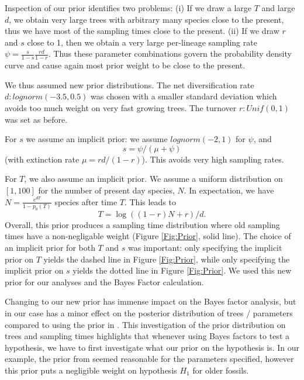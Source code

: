 \documentclass[11pt]{article}
\begin{document}
Inspection of our prior identifies two problems: (i) If we draw a large   $T$ and large $d$, we obtain very large trees with arbitrary many species close to the present, thus we have most of the sampling times close to the present. (ii) If we draw $r$ and $s$ close to 1, then we obtain a very large per-lineage  sampling rate $\psi=\frac{s}{1-s} \frac{rd}{1-r}$. Thus these parameter combinations govern the probability density curve and cause again most prior weight to be close to the present.

We thus assumed new prior distributions. The net diversification rate $d: lognorm(-3.5,0.5)$ was chosen with a  smaller standard deviation which avoids  too much weight on very fast growing trees. The turnover $r: Unif(0,1)$ was set as before. 

For $s$ we assume an implicit prior: we assume $lognorm(-2,1)$ for $\psi$, and $$s=\psi/(\mu+\psi)$$ (with extinction rate $\mu = r d /(1-r)$). This avoids very high sampling rates.

For $T$, we also assume an implicit prior. We assume a uniform distribution on $[1,100]$ for the number of present day species, $N$. In expectation, we have $N=  \frac{e^{d T}}{1-p_0(T)}$ species after time $T$. This leads to $$T=\log((1-r)N +r)/d.$$
Overall, this prior produces a sampling time distribution where old sampling times have a non-negligable weight (Figure \ref{Fig:Prior}, solid line). 
The choice of an implicit prior for both $T$ and $s$ was important: only specifying the implicit prior on $T$ yields the dashed line in Figure \ref{Fig:Prior}, while only specifying the implicit prior on $s$ yields the dotted line in Figure \ref{Fig:Prior}.
We used this new prior for our  analyses and the Bayes Factor calculation.

Changing to our new prior has immense impact on the Bayes factor analysis, but in our case has a minor effect on the posterior distribution of trees / parameters compared to using the prior in  \cite{gavryushkina2015bayesian}.
This investigation of the prior distribution on trees and sampling times highlights that whenever using Bayes factors to test a hypothesis, we have to first investigate what our prior on the hypothesis is. In our example, the  prior from \cite{gavryushkina2015bayesian} seemed reasonable for the parameters specified, however this prior puts a negligible weight on hypothesis $H_1$ for older fossils.
\end{document}
